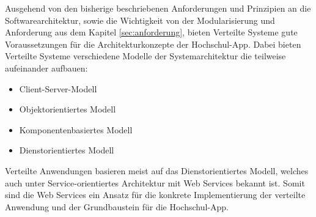 Ausgehend von den bisherige beschriebenen Anforderungen und Prinzipien an die Softwarearchitektur, sowie die Wichtigkeit von der Modularisierung und Anforderung aus dem Kapitel \ref{sec:anforderung}, bieten Verteilte Systeme gute Voraussetzungen für die Architekturkonzepte der Hochschul-App. Dabei bieten Verteilte Systeme verschiedene Modelle der Systemarchitektur die teilweise aufeinander aufbauen:
\begin{itemize}
\item Client-Server-Modell
\item Objektorientiertes Modell
\item Komponentenbasiertes Modell
\item Dienstorientiertes Modell
\end{itemize}
Verteilte Anwendungen basieren meist auf das Dienstorientiertes Modell, welches auch unter Service-orientiertes Architektur mit Web Services bekannt ist.
Somit sind die Web Services ein Ansatz für die konkrete Implementierung der verteilte Anwendung und der Grundbaustein für die Hochschul-App.